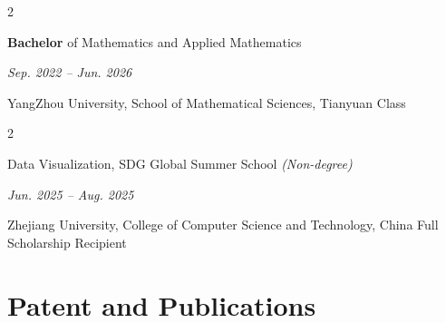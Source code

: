 \documentclass[10pt, letterpaper]{article}
\newenvironment{twocolentry}[2][]{
    \onecolentry
    \def\secondColumn{#2}
    \setcolumnwidth{\fill, 4.5 cm}
    \begin{paracol}{2}
}{
    \switchcolumn \raggedleft \secondColumn
    \end{paracol}
    \endonecolentry
} %
\begin{document}
        \begin{twocolentry}{
            \textit{Sep. 2022 – Jun. 2026}
        }
            
            \textbf{Bachelor} of Mathematics and Applied Mathematics
         \end{twocolentry}
            \vspace{0.10 cm}
             YangZhou University, School of Mathematical Sciences, Tianyuan Class
        \vspace{0.10 cm}






        \vspace{0.22 cm}

        \begin{twocolentry}{
            \textit{Jun. 2025 – Aug. 2025}
        }
           Data Visualization, SDG Global Summer School   \textit{(Non-degree)}
         \end{twocolentry}
            \vspace{0.10 cm}
               Zhejiang University, College of Computer Science and Technology, China
          \hfill{Full Scholarship Recipient}
            \vspace{0.03 cm}
        
        \vspace{0.1 cm}





\vspace{0.1 cm}


\providecommand{\enquote}[1]{``#1''}


\section{Patent and Publications}
\end{document}
